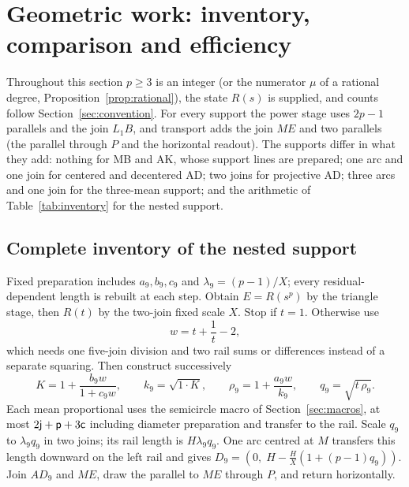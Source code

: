 \section{Geometric work: inventory, comparison and efficiency}\label{sec:work}

Throughout this section $p\ge3$ is an integer (or the numerator $\mu$ of a rational degree,
Proposition~\ref{prop:rational}), the state $R(s)$ is supplied, and counts follow
Section~\ref{sec:convention}. For every support the power stage uses $2p-1$ parallels and the join
$L_1B$, and transport adds the join $ME$ and two parallels (the parallel through $P$ and the horizontal
readout). The supports differ in what they add: nothing for MB and AK, whose support lines are
prepared; one arc and one join for centered and decentered AD; two joins for projective AD; three arcs
and one join for the three-mean support; and the arithmetic of Table~\ref{tab:inventory} for the
nested support.

\subsection{Complete inventory of the nested support}

Fixed preparation includes $a_9,b_9,c_9$ and $\lambda_9=(p-1)/X$; every residual-dependent length is
rebuilt at each step. Obtain $E=R(s^{p})$ by the triangle stage, then $R(t)$ by the two-join fixed scale
$X$. Stop if $t=1$. Otherwise use
\begin{equation}\label{eq:w}
w=t+\frac1t-2,
\end{equation}
which needs one five-join division and two rail sums or differences instead of a separate squaring.
Then construct successively
\[ K=1+\frac{b_9w}{1+c_9w},\qquad k_9=\sqrt{1\cdot K},\qquad \rho_9=1+\frac{a_9w}{k_9},\qquad
q_9=\sqrt{t\,\rho_9}. \]
Each mean proportional uses the semicircle macro of Section~\ref{sec:macros}, at most
$2\mathsf{j}+\mathsf{p}+3\mathsf{c}$ including diameter preparation and transfer to the rail. Scale $q_9$ to $\lambda_9q_9$
in two joins; its rail length is $H\lambda_9q_9$. One arc centred at $M$ transfers this length
downward on the left rail and gives $D_9=(0,\;H-\tfrac HX(1+(p-1)q_9))$. Join $AD_9$ and $ME$, draw the
parallel to $ME$ through $P$, and return horizontally.

